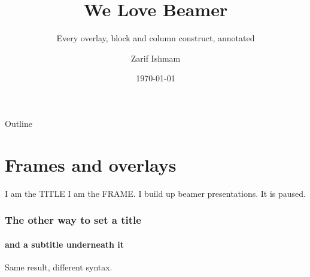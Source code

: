 \documentclass[aspectratio=169,11pt]{beamer}
\title[Beamer Demo]{We Love Beamer}
\subtitle{Every overlay, block and column construct, annotated}
\author[Zarif]{Zarif Ishmam}
\institute[CSE, BUET]{Department of Computer Science and Engineering, BUET}
\date{\today}
\begin{document}
\begin{frame}
    \maketitle
\end{frame}

\begin{frame}{Outline}
    \tableofcontents
\end{frame}


\section{Frames and overlays}

%
\begin{frame}{I am the TITLE}
    I am the FRAME. \pause I build up beamer presentations. \pause It is paused.
\end{frame}

\begin{frame}
    \frametitle{The other way to set a title}
    \framesubtitle{and a subtitle underneath it}
    Same result, different syntax.
\end{frame}

\end{document}
